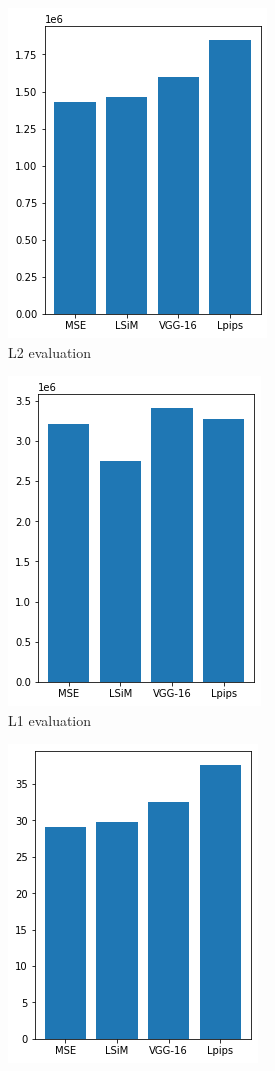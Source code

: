 \documentclass[a4paper,12pt,twoside]{report}
\begin{document}
 \begin{figure}
	\centering
	\begin{subfigure}{0.32\textwidth}
		\centering
		\includegraphics[scale=0.5]{autoencoder/l2eval.png}
		\caption{L2 evaluation}
	\end{subfigure}
	\begin{subfigure}{0.32\textwidth}
		\centering
		\includegraphics[scale=0.5]{autoencoder/l1eval.png}
		\caption{L1 evaluation}
	\end{subfigure}
	\begin{subfigure}{0.32\textwidth}
		\centering
		\includegraphics[scale=0.5]{autoencoder/mseeval.png}

\end{subfigure}
\end{figure}
\end{document}
